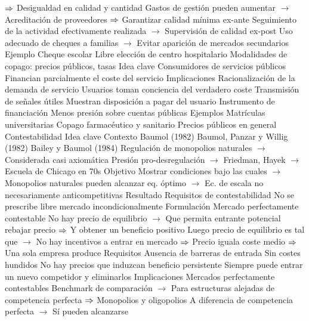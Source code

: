\documentclass{nuevotema}
\begin{document}
\begin{esquemal}
				\4[] $\then$ Desigualdad en calidad y cantidad
				\4[] Gastos de gestión pueden aumentar
				\4[] $\to$ Acreditación de proveedores
				\4[] $\then$ Garantizar calidad mínima ex-ante
				\4[] Seguimiento de la actividad efectivamente realizada
				\4[] $\to$ Supervisión de calidad ex-post
				\4[] Uso adecuado de cheques a familias
				\4[] $\to$ Evitar aparición de mercados secundarios
				\4 Ejemplo
				\4[] Cheque escolar
				\4[] Libre elección de centro hospitalario
			\3 Modalidades de copago: precios públicos, tasas
				\4 Idea clave
				\4[] Consumidores de servicios públicos
				\4[] Financian parcialmente el coste del servicio
				\4 Implicaciones
				\4[] Racionalización de la demanda de servicio
				\4[] Usuarios toman conciencia del verdadero coste
				\4[] Transmisión de señales útiles
				\4[] Muestran disposición a pagar del usuario
				\4[] Instrumento de financiación
				\4[] Menos presión sobre cuentas públicas
				\4 Ejemplos
				\4[] Matrículas universitarias
				\4[] Copago farmacéutico y sanitario
				\4[] Precios públicos en general
		\2 Contestabilidad
			\3 Idea clave
				\4 Contexto
				\4[] Baumol (1982)
				\4[] Baumol, Panzar y Willig (1982)
				\4[] Bailey y Baumol (1984)
				\4[] Regulación de monopolios naturales
				\4[] $\to$ Considerada casi axiomática
				\4[] Presión pro-desregulación
				\4[] $\to$ Friedman, Hayek
				\4[] $\to$ Escuela de Chicago en 70s
				\4 Objetivo
				\4[] Mostrar condiciones bajo las cuales
				\4[] $\to$ Monopolios naturales pueden alcanzar eq. óptimo
				\4[] $\to$ Ec. de escala no necesariamente anticompetitivas
				\4 Resultado
				\4[] Requisitos de contestabilidad
				\4[] No se prescribe libre mercado incondicionalmente
			\3 Formulación
				\4 Mercado perfectamente contestable
				\4[] No hay precio de equilibrio
				\4[] $\to$ Que permita entrante potencial rebajar precio
				\4[] $\then$ Y obtener un beneficio positivo
				\4[] Luego precio de equilibrio es tal que
				\4[] $\to$ No hay incentivos a entrar en mercado
				\4[] $\then$ Precio iguala coste medio
				\4[] $\then$ Una sola empresa produce
				\4 Requisitos
				\4[] Ausencia de barreras de entrada
				\4[] Sin costes hundidos
				\4[$\then$] No hay precios que induzcan beneficio persistente
				\4[] Siempre puede entrar un nuevo competidor y eliminarlos
			\3 Implicaciones
				\4 Mercados perfectamente contestables
				\4[] Benchmark de comparación
				\4[] $\to$ Para estructuras alejadas de competencia perfecta
				\4[] $\then$ Monopolios y oligopolios
				\4[] A diferencia de competencia perfecta
				\4[] $\to$ Sí pueden alcanzarse

\end{esquemal}
\end{document}
